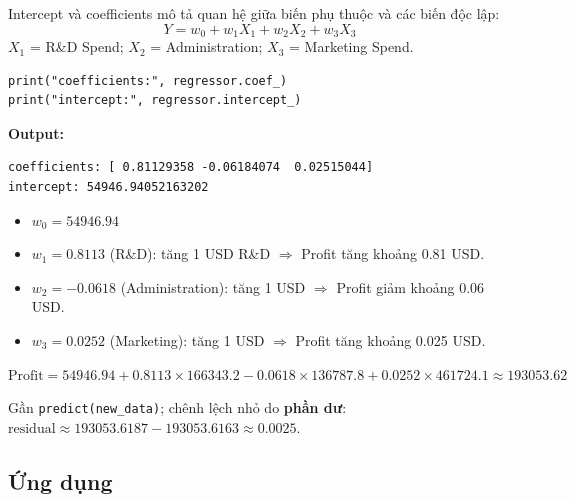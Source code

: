 \begin{dinhnghia}[title={Tham số mô hình (intercept và hệ số)}]
Intercept và coefficients mô tả quan hệ giữa biến phụ thuộc và các biến độc lập:
\[
Y = w_0 + w_1 X_1 + w_2 X_2 + w_3 X_3
\]
$X_1$ = R\&D Spend; $X_2$ = Administration; $X_3$ = Marketing Spend.
\end{dinhnghia}

\begin{vidu}[title={In hệ số và chặn}]
\begin{lstlisting}
print("coefficients:", regressor.coef_)
print("intercept:", regressor.intercept_)
\end{lstlisting}

\textbf{Output:}
\begin{verbatim}
coefficients: [ 0.81129358 -0.06184074  0.02515044]
intercept: 54946.94052163202
\end{verbatim}
\end{vidu}

\begin{phuongphap}[title={Giải thích hệ số}]
\begin{itemize}
  \item $w_0 = 54946.94$
  \item $w_1 = 0.8113$ (R\&D): tăng 1 USD R\&D $\Rightarrow$ Profit tăng khoảng 0.81 USD.
  \item $w_2 = -0.0618$ (Administration): tăng 1 USD $\Rightarrow$ Profit giảm khoảng 0.06 USD.
  \item $w_3 = 0.0252$ (Marketing): tăng 1 USD $\Rightarrow$ Profit tăng khoảng 0.025 USD.
\end{itemize}
\end{phuongphap}

\begin{vidu}[title={Kiểm chứng tay}]
$\mathrm{Profit} = 54946.94 + 0.8113 \times 166343.2 - 0.0618 \times 136787.8 + 0.0252 \times 461724.1
\approx 193053.62$

Gần \texttt{predict(new\_data)}; chênh lệch nhỏ do \textbf{phần dư}:
$\text{residual} \approx 193053.6187 - 193053.6163 \approx 0.0025$.
\end{vidu}

\subsection{Ứng dụng}

